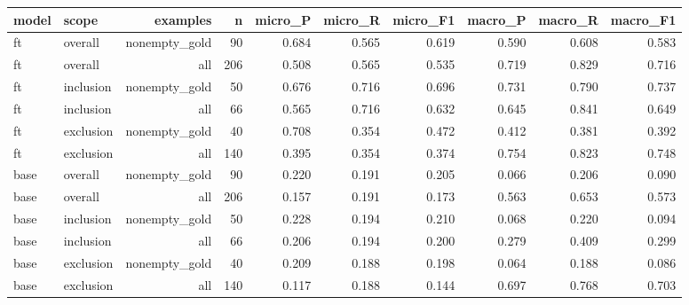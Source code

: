 \begin{tabular}{llrrrrrrrr}
\toprule
model & scope & examples & n & micro\_P & micro\_R & micro\_F1 & macro\_P & macro\_R & macro\_F1 \\
\midrule
ft & overall & nonempty\_gold & 90 & 0.684 & 0.565 & 0.619 & 0.590 & 0.608 & 0.583 \\
ft & overall & all & 206 & 0.508 & 0.565 & 0.535 & 0.719 & 0.829 & 0.716 \\
ft & inclusion & nonempty\_gold & 50 & 0.676 & 0.716 & 0.696 & 0.731 & 0.790 & 0.737 \\
ft & inclusion & all & 66 & 0.565 & 0.716 & 0.632 & 0.645 & 0.841 & 0.649 \\
ft & exclusion & nonempty\_gold & 40 & 0.708 & 0.354 & 0.472 & 0.412 & 0.381 & 0.392 \\
ft & exclusion & all & 140 & 0.395 & 0.354 & 0.374 & 0.754 & 0.823 & 0.748 \\
base & overall & nonempty\_gold & 90 & 0.220 & 0.191 & 0.205 & 0.066 & 0.206 & 0.090 \\
base & overall & all & 206 & 0.157 & 0.191 & 0.173 & 0.563 & 0.653 & 0.573 \\
base & inclusion & nonempty\_gold & 50 & 0.228 & 0.194 & 0.210 & 0.068 & 0.220 & 0.094 \\
base & inclusion & all & 66 & 0.206 & 0.194 & 0.200 & 0.279 & 0.409 & 0.299 \\
base & exclusion & nonempty\_gold & 40 & 0.209 & 0.188 & 0.198 & 0.064 & 0.188 & 0.086 \\
base & exclusion & all & 140 & 0.117 & 0.188 & 0.144 & 0.697 & 0.768 & 0.703 \\
\bottomrule
\end{tabular}
